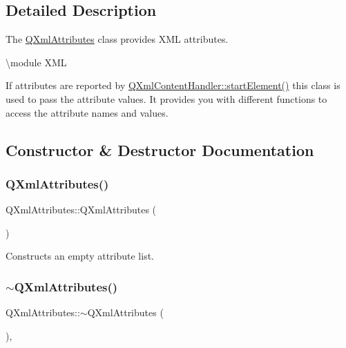 \subsection{Detailed Description}
The \mbox{\hyperlink{class_q_xml_attributes}{Q\+Xml\+Attributes}} class provides X\+ML attributes. 

\textbackslash{}module X\+ML

If attributes are reported by \mbox{\hyperlink{class_q_xml_content_handler_af6d4e631fad2b9b75622c95003b1da55}{Q\+Xml\+Content\+Handler\+::start\+Element()}} this class is used to pass the attribute values. It provides you with different functions to access the attribute names and values. 

\subsection{Constructor \& Destructor Documentation}
\mbox{\label{class_q_xml_attributes_a074730261cfe3a0f4292cbda7854892b}} 
\subsubsection{\texorpdfstring{QXmlAttributes()}{QXmlAttributes()}}
{\footnotesize\ttfamily Q\+Xml\+Attributes\+::\+Q\+Xml\+Attributes (\begin{DoxyParamCaption}{ }\end{DoxyParamCaption})\hspace{0.3cm}{\ttfamily [inline]}}

Constructs an empty attribute list. \mbox{\label{class_q_xml_attributes_a2d482c168ff403041fc1dd2fc8044a7b}} 
\subsubsection{\texorpdfstring{$\sim$QXmlAttributes()}{~QXmlAttributes()}}
{\footnotesize\ttfamily Q\+Xml\+Attributes\+::$\sim$\+Q\+Xml\+Attributes (\begin{DoxyParamCaption}{ }\end{DoxyParamCaption})\hspace{0.3cm}{\ttfamily [inline]}, {\ttfamily [virtual]}}

